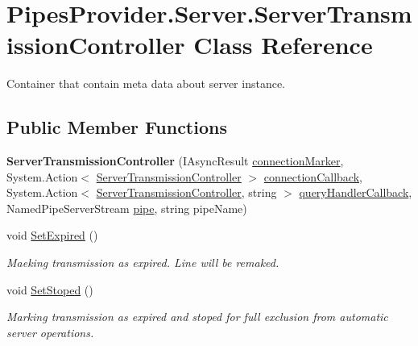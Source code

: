 \hypertarget{class_pipes_provider_1_1_server_1_1_server_transmission_controller}{}\section{Pipes\+Provider.\+Server.\+Server\+Transmission\+Controller Class Reference}
\label{class_pipes_provider_1_1_server_1_1_server_transmission_controller}


Container that contain meta data about server instance.  


\subsection*{Public Member Functions}
\begin{DoxyCompactItemize}
\item 
\mbox{\label{class_pipes_provider_1_1_server_1_1_server_transmission_controller_ac17320ff6c6ff4cbea5c1a2337b70cc4}} 
{\bfseries Server\+Transmission\+Controller} (I\+Async\+Result \mbox{\hyperlink{class_pipes_provider_1_1_server_1_1_server_transmission_controller_a6b9961d3fbf62a102b63de402aed5516}{connection\+Marker}}, System.\+Action$<$ \mbox{\hyperlink{class_pipes_provider_1_1_server_1_1_server_transmission_controller}{Server\+Transmission\+Controller}} $>$ \mbox{\hyperlink{class_pipes_provider_1_1_server_1_1_server_transmission_controller_a618854b229e8b0c8f98ce02985e576c7}{connection\+Callback}}, System.\+Action$<$ \mbox{\hyperlink{class_pipes_provider_1_1_server_1_1_server_transmission_controller}{Server\+Transmission\+Controller}}, string $>$ \mbox{\hyperlink{class_pipes_provider_1_1_server_1_1_server_transmission_controller_a05c4175dad51cde531703ba9ed4fc8ea}{query\+Handler\+Callback}}, Named\+Pipe\+Server\+Stream \mbox{\hyperlink{class_pipes_provider_1_1_server_1_1_server_transmission_controller_a221ea11d175f2ecde78419322df272de}{pipe}}, string pipe\+Name)
\item 
void \mbox{\hyperlink{class_pipes_provider_1_1_server_1_1_server_transmission_controller_a4460b8f1647a38d120416cb5e216feba}{Set\+Expired}} ()
\begin{DoxyCompactList}\small\item\em Maeking transmission as expired. Line will be remaked. \end{DoxyCompactList}\item 
void \mbox{\hyperlink{class_pipes_provider_1_1_server_1_1_server_transmission_controller_aa15fc867654c48ab79d44bfb1616e6a5}{Set\+Stoped}} ()
\begin{DoxyCompactList}\small\item\em Marking transmission as expired and stoped for full exclusion from automatic server operations. \end{DoxyCompactList}\end{DoxyCompactItemize}
